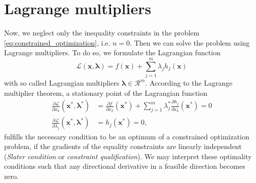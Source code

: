 \section{Lagrange multipliers}
Now, we neglect only the inequality constraints in the problem \eqref{eq:constrained_optimization}, i.e. $n=0$. Then we can solve the problem using Lagrange multipliers. To do so, we formulate the Lagrangian function
\begin{equation}
    \mathcal{\mathcal{L}} (\mathbf{x}, \pmb{\lambda}) = f(\mathbf{x}) + \sum_{j=1}^m \lambda_j h_j(\mathbf{x}) 
\end{equation}
with so called Lagrangian multipliers $\pmb{\lambda} \in \mathcal{R}^m$. 
According to the Lagrange multiplier theorem, a stationary point of the Lagrangian function 
\begin{align}
    \frac{\partial \mathcal{\mathcal{L}}}{\partial x_k} (\mathbf{x}^*, \pmb{\lambda}^*) &= \frac{\partial f }{\partial x_k} (\mathbf{x}^*) + \sum_{j=1}^m \lambda_j^* \frac{\partial h_j}{\partial x_k} (\mathbf{x}^*) = 0\\
    \frac{\partial \mathcal{\mathcal{L}}}{\partial \lambda_j} (\mathbf{x}^*, \pmb{\lambda}^*) &= h_j(\mathbf{x}^*) = 0,
\end{align}
fulfills the necessary condition to be an optimum of a constrained optimization problem, if the gradients of the equality constraints are linearly independent (\emph{Slater condition} or \emph{constraint qualification}). We may interpret these optimality conditions such that any directional derivative in a feasible direction becomes zero.

